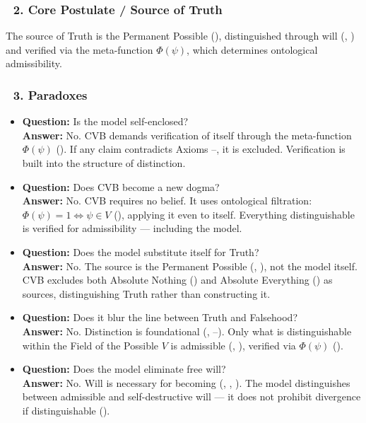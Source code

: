 \documentclass[12pt]{article}
\begin{document}
\subsubsection*{🔷 2. Core Postulate / Source of Truth}

The source of Truth is the Permanent Possible (\text{[4.4]}), distinguished through will (\text{[9]}, \text{[10.6]}) and verified via the meta-function $\Phi(\psi)$, which determines ontological admissibility.

\subsubsection*{🔻 3. Paradoxes}

\begin{itemize}
\item \textbf{Question:} Is the model self-enclosed?  
\\ \textbf{Answer:} No. CVB demands verification of itself through the meta-function $\Phi(\psi)$ (\text{[11.1.1.4]}). If any claim contradicts Axioms \text{[1]}–\text{[3]}, it is excluded. Verification is built into the structure of distinction.

\item \textbf{Question:} Does CVB become a new dogma?  
\\ \textbf{Answer:} No. CVB requires no belief. It uses ontological filtration: $\Phi(\psi) = 1 \Leftrightarrow \psi \in V$ (\text{[11.1.1]}), applying it even to itself. Everything distinguishable is verified for admissibility — including the model.

\item \textbf{Question:} Does the model substitute itself for Truth?  
\\ \textbf{Answer:} No. The source is the Permanent Possible (\text{[4.4]}, \text{[6]}), not the model itself. CVB excludes both Absolute Nothing (\text{[1]}) and Absolute Everything (\text{[2]}) as sources, distinguishing Truth rather than constructing it.

\item \textbf{Question:} Does it blur the line between Truth and Falsehood?  
\\ \textbf{Answer:} No. Distinction is foundational (\text{[9.1]}, \text{[11.2.1]}–\text{[11.2.2]}). Only what is distinguishable within the Field of the Possible $V$ is admissible (\text{[4]}, \text{[4.4]}), verified via $\Phi(\psi)$ (\text{[11.1.1]}).

\item \textbf{Question:} Does the model eliminate free will?  
\\ \textbf{Answer:} No. Will is necessary for becoming (\text{[4.3]}, \text{[10.6]}, \text{[12.2]}). The model distinguishes between admissible and self-destructive will — it does not prohibit divergence if distinguishable (\text{[11.5]}).


\end{itemize}
\end{document}
